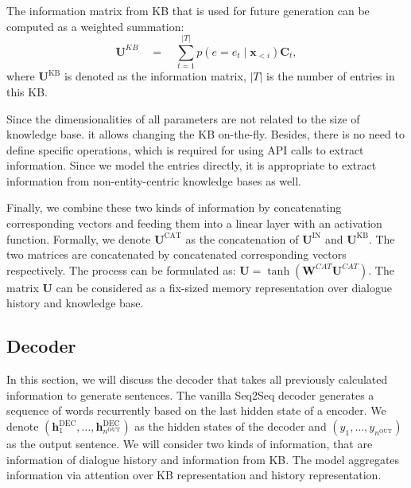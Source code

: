 \documentclass[11pt]{article}
\begin{document}
The information matrix from KB that is used for future generation can be computed as a weighted summation:
\[\boldsymbol U^{\textit{KB}} \quad=\quad \sum_{t = 1}^{|T|}p(e = e_t\mid \boldsymbol x_{<i})  \boldsymbol C_t,
\]
where $\boldsymbol U^{\text{KB}}$ is denoted as the information matrix, $|T|$ is the number of entries in this KB.

Since the dimensionalities of all parameters are not related to the size of knowledge base. it allows changing the KB on-the-fly. Besides, there is no need to define specific operations, which is required for using API calls to extract information. Since we model the entries directly, it is appropriate to extract information from non-entity-centric knowledge bases as well.

Finally, we combine these two kinds of information by concatenating corresponding vectors and feeding them into a linear layer with an activation function. Formally, we denote $\boldsymbol U^{\text{CAT}}$ as the concatenation of $\boldsymbol U^{\text{IN}}$ and $\boldsymbol U^{\text{KB}}$. The two matrices are concatenated by concatenated corresponding vectors respectively. The process can be formulated as:
 $\boldsymbol U = \tanh \left(\boldsymbol W^{\textit{CAT}} \boldsymbol U^{\textit{CAT}}\right)$. The matrix $\boldsymbol{U}$ can be considered as a fix-sized memory representation over dialogue history and knowledge base.

\subsection{Decoder}
In this section, we will discuss the decoder that takes all previously calculated information to generate sentences. The vanilla Seq2Seq decoder generates a sequence of words recurrently based on the last hidden state of a encoder. We denote $\left(\boldsymbol h^{\text{DEC}}_1, \ldots, \boldsymbol h^{\text{DEC}}_{n^{\text{OUT}}}\right)$ as the hidden states of the decoder and $\left(y_1, \ldots, y_{n^{\text{OUT}}}\right)$ as the output sentence. We will consider two kinds of information, that are information of dialogue history and information from KB. The model aggregates information via attention over KB representation and history representation.
\end{document}
